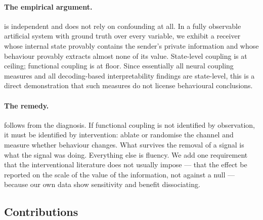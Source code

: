 \documentclass[11pt,a4paper]{article}
\theoremstyle{plain}
\theoremstyle{definition}
\theoremstyle{remark}
\begin{document}
\paragraph{The empirical argument.}
 is independent and does not rely on confounding at all. In a fully
observable artificial system with ground truth over every variable, we exhibit a receiver
whose internal state provably contains the sender's private information and whose behaviour
provably extracts almost none of its value. State-level coupling is at ceiling; functional
coupling is at floor. Since essentially all neural coupling measures and all decoding-based
interpretability findings are state-level, this is a direct demonstration that such measures
do not license behavioural conclusions.

\paragraph{The remedy.}
 follows from the diagnosis. If functional coupling is not identified by
observation, it must be identified by intervention: ablate or randomise the channel and
measure whether behaviour changes. What survives the removal of a signal is what the signal
was doing. Everything else is fluency. We add one requirement that the interventional
literature does not usually impose --- that the effect be reported on the scale of the value
of the information, not against a null --- because our own data show sensitivity and benefit
dissociating.

\subsection{Contributions}\label{sec:contributions}
\end{document}
